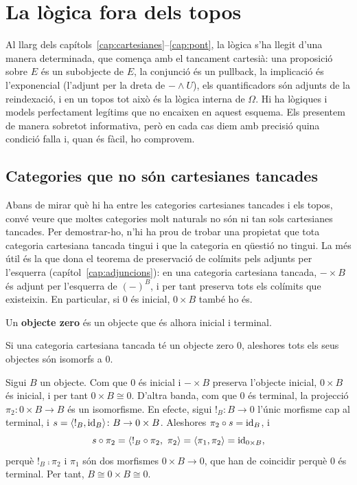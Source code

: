 \section{La lògica fora dels topos}
\label{sec:fora-topos}

Al llarg dels capítols~\ref{cap:cartesianes}--\ref{cap:pont}, la lògica s'ha llegit d'una manera determinada, que comença amb el tancament cartesià: una proposició sobre $E$ és un subobjecte de $E$, la conjunció és un pullback, la implicació és l'exponencial (l'adjunt per la dreta de $-\wedge U$), els quantificadors són adjunts de la reindexació, i en un topos tot això és la lògica interna de $\Omega$. Hi ha lògiques i models perfectament legítims que no encaixen en aquest esquema. Els presentem de manera sobretot informativa, però en cada cas diem amb precisió quina condició falla i, quan és fàcil, ho comprovem.

\subsection{Categories que no són cartesianes tancades}
\label{subsec:no-ccc}

Abans de mirar què hi ha entre les categories cartesianes tancades i els topos, convé veure que moltes categories molt naturals no són ni tan sols cartesianes tancades. Per demostrar-ho, n'hi ha prou de trobar una propietat que tota categoria cartesiana tancada tingui i que la categoria en qüestió no tingui. La més útil és la que dona el teorema de preservació de colímits pels adjunts per l'esquerra (capítol~\ref{cap:adjuncions}): en una categoria cartesiana tancada, $-\times B$ és adjunt per l'esquerra de $(-)^B$, i per tant preserva tots els colímits que existeixin. En particular, si $0$ és inicial, $0\times B$ també ho és.

Un \textbf{objecte zero} és un objecte que és alhora inicial i terminal.

\begin{proposicio}\label{prop:zero-no-ccc}
Si una categoria cartesiana tancada té un objecte zero $0$, aleshores tots els seus objectes són isomorfs a $0$.
\end{proposicio}

\begin{prova}
Sigui $B$ un objecte. Com que $0$ és inicial i $-\times B$ preserva l'objecte inicial, $0\times B$ és inicial, i per tant $0\times B\cong0$. D'altra banda, com que $0$ és terminal, la projecció $\pi_2\colon0\times B\to B$ és un isomorfisme. En efecte, sigui $!_B\colon B\to0$ l'únic morfisme cap al terminal, i $s=\langle !_B,\operatorname{id}_B\rangle\colon B\to0\times B$. Aleshores $\pi_2\circ s=\operatorname{id}_B$, i
\[
s\comp\pi_2=\langle !_B\comp\pi_2,\ \pi_2\rangle=\langle\pi_1,\pi_2\rangle=\id_{0\times B},
\]
perquè $!_B\comp\pi_2$ i $\pi_1$ són dos morfismes $0\times B\to0$, que han de coincidir perquè $0$ és terminal. Per tant, $B\cong0\times B\cong0$.
\end{prova}

